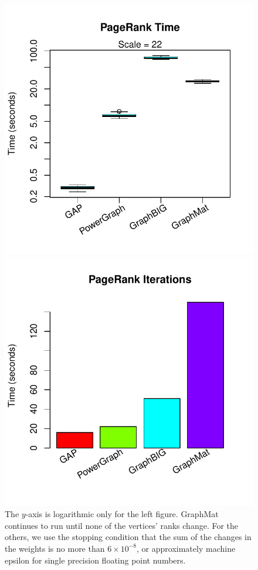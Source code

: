 \documentclass{llncs}
\begin{document}
\begin{figure}
	\centering
	\begin{minipage}{0.48\linewidth}
		\includegraphics[width=\linewidth, trim=0pt 18pt 18pt 0pt, clip]{graphics/pr_time.pdf}
	\end{minipage}
	\begin{minipage}{0.48\linewidth}
		\includegraphics[width=\linewidth, trim=0 18pt 18pt 0pt, clip]{graphics/pr_iters.pdf}
	\end{minipage}
	\caption{The $y$-axis is logarithmic only for the left figure. GraphMat continues to run until none of the vertices' ranks change. For the others, we use the stopping condition that the sum of the changes in the weights is no more than $6 \times 10^{-8}$, or approximately machine epsilon for single precision floating point numbers.}
	\label{fig:pr}
\end{figure}
\end{document}
